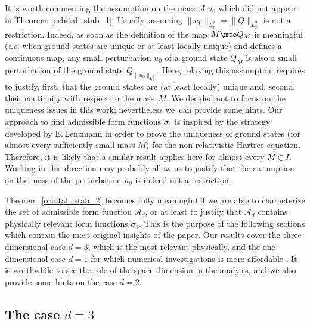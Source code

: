 It is worth commenting the assumption on the mass of $u_{0}$ which did not appear in Theorem~\ref{orbital_stab_1}. Usually, assuming $\|u_{0}\|_{L_{x}^{2}}=\|Q\|_{L_{x}^{2}}$ is not a restriction. Indeed, as soon as the definition of the map $M\mto Q_{M}$ is meaningful (\emph{i.e.} when ground states are unique or at least locally unique) and defines a continuous map, any small perturbation $u_{0}$ of a ground state $Q_{M}$ is also a small perturbation of the ground state $Q_{\|u_{0}\|_{L_{x}^{2}}}$. Here, relaxing this assumption
requires to justify, first,
that the ground states are (at least locally) unique and, second, their continuity with respect to the mass~$M$. We decided not to
focus on the uniqueness issues in this work; nevertheless we~can provide some hints.
Our approach to find admissible form functions $\sigma_{1}$ is inspired by the strategy developed by E.\,Lenzmann \cite{Lenzmann} in order to prove the uniqueness of ground states (for almost every sufficiently small mass $M$) for the non relativistic Hartree equation.
Therefore, it is likely that a similar result applies here for almost every $M\in I$. Working in this direction may probably allow us to justify that the assumption on the mass of the perturbation $u_{0}$ is indeed not a restriction.

Theorem~\ref{orbital_stab_2} becomes fully meaningful if we are able to characterize the set of admissible form function $\mathscr{A}_{d}$, or at least to justify that $\mathscr{A}_{d}$ contains physically relevant form functions $\sigma_{1}$. This is the purpose of the following sections which contain the most original insights of the paper.
Our results cover the three-dimensional case $d=3$, which is the most relevant physically, and the one-dimensional case $d=1$
for which numerical investigations is more affordable \cite{LVNum2}.
It is worthwhile to see the role of the space dimension in the analysis, and we also provide some hints on the case
$d=2$.

\subsection{The case $d=3$}


